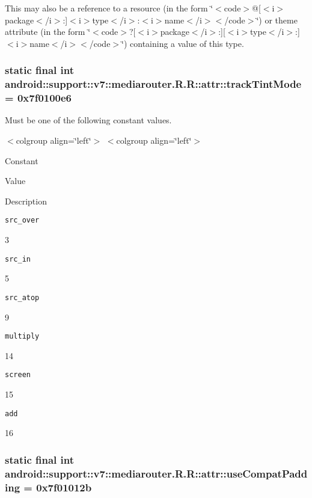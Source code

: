 This may also be a reference to a resource (in the form \char`\"{}$<$code$>$@\mbox{[}$<$i$>$package$<$/i$>$:\mbox{]}$<$i$>$type$<$/i$>$:$<$i$>$name$<$/i$>$$<$/code$>$\char`\"{}) or theme attribute (in the form \char`\"{}$<$code$>$?\mbox{[}$<$i$>$package$<$/i$>$:\mbox{]}\mbox{[}$<$i$>$type$<$/i$>$:\mbox{]}$<$i$>$name$<$/i$>$$<$/code$>$\char`\"{}) containing a value of this type. \hypertarget{classandroid_1_1support_1_1v7_1_1mediarouter_1_1_r_1_1attr_d3e89244fa6b6cb941b7950e46bbacb8}{
\subsubsection[{trackTintMode}]{\setlength{\rightskip}{0pt plus 5cm}static final int android::support::v7::mediarouter.R.R::attr::trackTintMode = 0x7f0100e6}}
\label{classandroid_1_1support_1_1v7_1_1mediarouter_1_1_r_1_1attr_d3e89244fa6b6cb941b7950e46bbacb8}


Must be one of the following constant values. \begin{TabularC}{0}
\hline
\end{TabularC}
$<$colgroup align=\char`\"{}left\char`\"{}$>$ $<$colgroup align=\char`\"{}left\char`\"{}$>$ 

Constant

Value

Description 

{\tt src\_\-over}

3

{\tt src\_\-in}

5

{\tt src\_\-atop}

9

{\tt multiply}

14

{\tt screen}

15

{\tt add}

16\hypertarget{classandroid_1_1support_1_1v7_1_1mediarouter_1_1_r_1_1attr_5979db87d202ecdc19f4b531e4c66e50}{
\subsubsection[{useCompatPadding}]{\setlength{\rightskip}{0pt plus 5cm}static final int android::support::v7::mediarouter.R.R::attr::useCompatPadding = 0x7f01012b}}
\label{classandroid_1_1support_1_1v7_1_1mediarouter_1_1_r_1_1attr_5979db87d202ecdc19f4b531e4c66e50}


